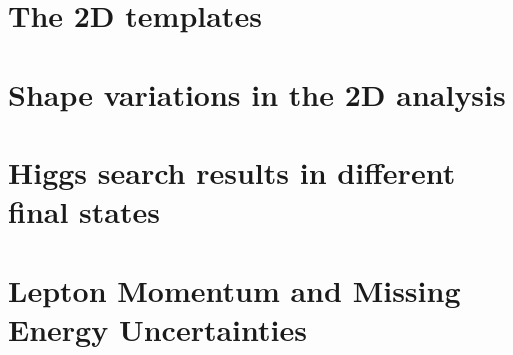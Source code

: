 \documentclass{cmspaper}
\begin{document}
%   

%     

\section{The 2D templates}
     \label{app:appendix_2dtemplate}
     
\clearpage

\section{Shape variations in the 2D analysis}
     \label{app:appendix_shapevar_2d}
     
\clearpage



\section{Higgs search results in different final states}
     \label{app:appendix_limits_bychannel}
     
\clearpage

%     


\section{Lepton Momentum and Missing Energy Uncertainties}
     \label{app:lep_met_res}
     
\end{document}
